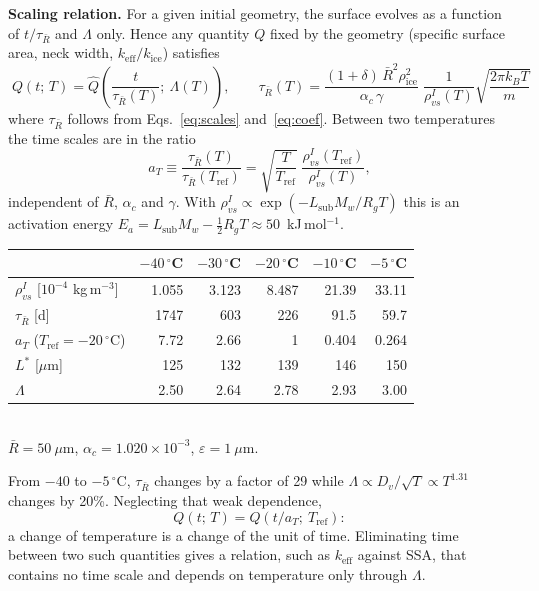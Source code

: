 \documentclass[11pt]{article}
\newcommand{\ice}{\mathrm{ice}}
\newcommand{\Rbar}{\bar R}
\newcommand{\rvs}{\rho_{vs}^{I}}
\begin{document}
\textbf{Scaling relation.} For a given initial geometry, the surface evolves
as a function of $t/\tau_{\Rbar}$ and $\Lambda$ only. Hence any quantity $Q$ fixed
by the geometry (specific surface area, neck width,
$k_{\mathrm{eff}}/k_\ice$) satisfies
\begin{equation}
\boxed{\;Q(t;\,T) = \widehat Q\!\left(\frac{t}{\tau_{\Rbar}(T)};\ \Lambda(T)\right),\qquad
\tau_{\Rbar}(T) = \frac{(1+\delta)\,\Rbar^{2}\rho_\ice^{2}}{\alpha_c\,\gamma}\;\frac{1}{\rvs(T)}\sqrt{\frac{2\pi k_B T}{m}}\;}
\label{eq:result}
\end{equation}
where $\tau_{\Rbar}$ follows from Eqs.~\eqref{eq:scales} and~\eqref{eq:coef}. Between
two temperatures the time scales are in the ratio
\begin{equation}
a_T \equiv \frac{\tau_{\Rbar}(T)}{\tau_{\Rbar}(T_{\mathrm{ref}})} = \sqrt{\frac{T}{T_{\mathrm{ref}}}}\;\frac{\rvs(T_{\mathrm{ref}})}{\rvs(T)} ,
\label{eq:aT}
\end{equation}
independent of $\Rbar$, $\alpha_c$ and $\gamma$. With $\rvs \propto
\exp(-L_{\mathrm{sub}}M_w/R_gT)$ this is an activation energy $E_a =
L_{\mathrm{sub}}M_w - \tfrac12 R_gT \approx 50$~kJ\,mol$^{-1}$.

\begin{center}\begin{tabular}{lrrrrr}\toprule
 & $-40\,^{\circ}$C & $-30\,^{\circ}$C & $-20\,^{\circ}$C & $-10\,^{\circ}$C & $-5\,^{\circ}$C\\\midrule
$\rvs$ [$10^{-4}$ kg\,m$^{-3}$] & 1.055 & 3.123 & 8.487 & 21.39 & 33.11\\
$\tau_{\Rbar}$ [d] & 1747 & 603 & 226 & 91.5 & 59.7\\
$a_T$ ($T_{\mathrm{ref}} = -20\,^{\circ}$C) & 7.72 & 2.66 & 1 & 0.404 & 0.264\\
$L^{*}$ [$\mu$m] & 125 & 132 & 139 & 146 & 150\\
$\Lambda$ & 2.50 & 2.64 & 2.78 & 2.93 & 3.00\\\bottomrule
\end{tabular}\\[0.4ex]
{\small $\Rbar = 50~\mu$m, $\alpha_c = 1.020\times10^{-3}$, $\varepsilon = 1~\mu$m.}
\end{center}

From $-40$ to $-5\,^{\circ}$C, $\tau_{\Rbar}$ changes by a factor of 29 while
$\Lambda \propto D_v/\sqrt T \propto T^{1.31}$ changes by 20\%. Neglecting
that weak dependence,
\begin{equation}
Q(t;\,T) = Q\!\left(t/a_T;\ T_{\mathrm{ref}}\right):
\end{equation}
a change of temperature is a change of the unit of time. Eliminating time
between two such quantities gives a relation, such as $k_{\mathrm{eff}}$
against SSA, that contains no time scale and depends on temperature only
through $\Lambda$.
\end{document}
